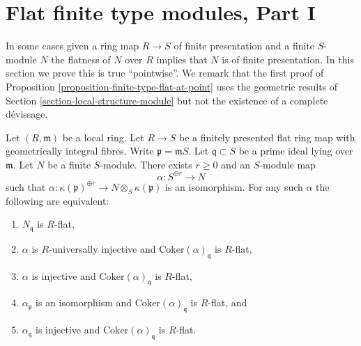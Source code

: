 \section{Flat finite type modules, Part I}
\label{section-finite-type-flat-I}

\noindent
In some cases given a ring map $R \to S$ of finite presentation and
a finite $S$-module $N$ the flatness of $N$ over $R$ implies that $N$
is of finite presentation. In this section we prove this is true
``pointwise''. We remark that the first proof of
Proposition \ref{proposition-finite-type-flat-at-point}
uses the geometric results of
Section \ref{section-local-structure-module}
but not the existence of a complete d\'evissage.

\begin{lemma}
\label{lemma-induction-step}
Let $(R, \mathfrak m)$ be a local ring. Let $R \to S$ be a finitely presented
flat ring map with geometrically integral fibres. Write
$\mathfrak p = \mathfrak mS$. Let $\mathfrak q \subset S$ be a prime ideal
lying over $\mathfrak m$. Let $N$ be a finite $S$-module.
There exists $r \geq 0$ and an $S$-module map
$$
\alpha : S^{\oplus r} \longrightarrow N
$$
such that
$\alpha : \kappa(\mathfrak p)^{\oplus r} \to N \otimes_S \kappa(\mathfrak p)$
is an isomorphism. For any such $\alpha$ the following are equivalent:
\begin{enumerate}
\item $N_{\mathfrak q}$ is $R$-flat,
\item $\alpha$ is $R$-universally injective and
$\text{Coker}(\alpha)_{\mathfrak q}$ is $R$-flat,
\item $\alpha$ is injective and
$\text{Coker}(\alpha)_{\mathfrak q}$ is $R$-flat,
\item $\alpha_{\mathfrak p}$ is an isomorphism and
$\text{Coker}(\alpha)_{\mathfrak q}$ is $R$-flat, and
\item $\alpha_{\mathfrak q}$ is injective and
$\text{Coker}(\alpha)_{\mathfrak q}$ is $R$-flat.
\end{enumerate}
\end{lemma}

